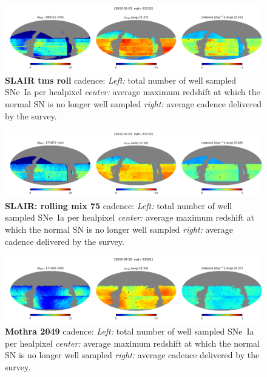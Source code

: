 \begin{figure}[h!]
  \begin{center}
    \includegraphics[width=\linewidth]{Figures/tms_roll_10yrs_64_maps.png}
    \caption{{\bf SLAIR tms roll} cadence: {\em Left:} total number of well
      sampled SNe~Ia per healpixel {\em center:} average maximum
      redshift at which the normal SN is no longer well sampled {\em
        right:} average cadence delivered by the survey.}
    \label{fig:tms_roll}
  \end{center}
\end{figure}

\begin{figure}[h!]
  \begin{center}
    \includegraphics[width=\linewidth]{Figures/rolling_mix_75_10yrs_64_maps.png}
    \caption{{\bf SLAIR: rolling mix 75} cadence: {\em Left:} total number of well
      sampled SNe~Ia per healpixel {\em center:} average maximum
      redshift at which the normal SN is no longer well sampled {\em
        right:} average cadence delivered by the survey.}
    \label{fig:rolling_mix_75}
  \end{center}
\end{figure}


\begin{figure}[h!]
  \begin{center}
    \includegraphics[width=\linewidth]{Figures/mothra_2049_64_maps.png}
    \caption{{\bf Mothra 2049} cadence: {\em Left:} total number of well
      sampled SNe~Ia per healpixel {\em center:} average maximum
      redshift at which the normal SN is no longer well sampled {\em
        right:} average cadence delivered by the survey.}
    \label{fig:mothra_2049}
  \end{center}
\end{figure}

